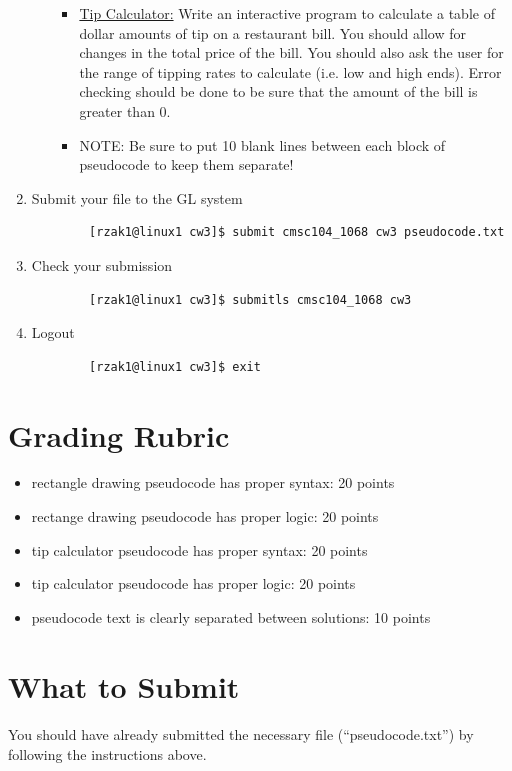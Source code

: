\documentclass[letter,11pt]{article}
\begin{document}
\begin{enumerate}
\begin{itemize}
\begin{itemize}
            \item \underline{Tip Calculator:} Write an interactive program to calculate a table of dollar amounts of tip on a restaurant bill. You should allow for changes in the total price of the bill. You should also ask the user for the range of tipping rates to calculate (i.e. low and high ends). Error checking should be done to be sure that the amount of the bill is greater than 0.
            \item NOTE: Be sure to put 10 blank lines between each block of pseudocode to keep them separate!
        \end{itemize}
    \end{itemize}
    \item Submit your file to the GL system
    \begin{verbatim}
        [rzak1@linux1 cw3]$ submit cmsc104_1068 cw3 pseudocode.txt
    \end{verbatim}
    \item Check your submission
    \begin{verbatim}
        [rzak1@linux1 cw3]$ submitls cmsc104_1068 cw3
    \end{verbatim}
    \item Logout
    \begin{verbatim}
        [rzak1@linux1 cw3]$ exit
    \end{verbatim}
\end{enumerate}

\section*{Grading Rubric}
\begin{itemize}
    \item rectangle drawing pseudocode has proper syntax: 20 points
    \item rectange drawing pseudocode has proper logic: 20 points
    \item tip calculator pseudocode has proper syntax: 20 points
    \item tip calculator pseudocode has proper logic: 20 points
    \item pseudocode text is clearly separated between solutions: 10 points
\end{itemize}

\section*{What to Submit}
\paragraph{}You should have already submitted the necessary file (``pseudocode.txt'') by following the instructions above.
\end{document}

